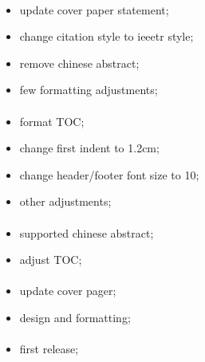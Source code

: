 \paragraph{}
	\begin{itemize}[noitemsep]
		\item update cover paper statement;
		\item change citation style to ieeetr style;
		\item remove chinese abstract;
		\item few formatting adjustments;
	\end{itemize}

\paragraph{}
	\begin{itemize}[noitemsep]
		\item format TOC;
		\item change first indent to 1.2cm;
		\item change header/footer font size to 10;
		\item other adjustments;
	\end{itemize}

\paragraph{}
	\begin{itemize}[noitemsep]
		\item supported chinese abstract;
		\item adjust TOC;
	\end{itemize}

\paragraph{}
	\begin{itemize}[noitemsep]
		\item update cover pager;
		\item design and formatting;
	\end{itemize}

\paragraph{}
	\begin{itemize}[noitemsep]
		\item first release;
	\end{itemize}

\makeatletter
\let\ttdefault\ttdefault@save
\makeatother
\endinput

